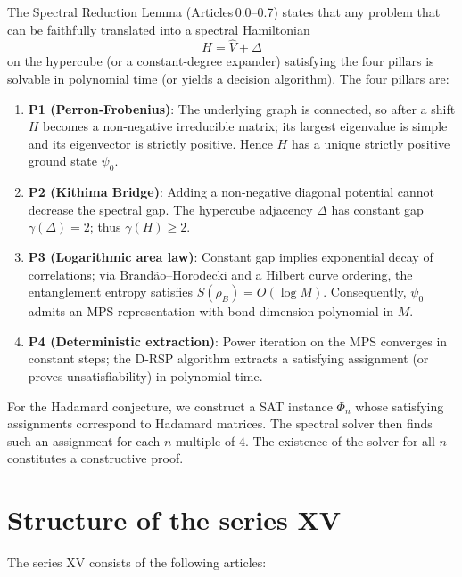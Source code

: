 \documentclass[11pt,a4paper]{article}
\begin{document}
The Spectral Reduction Lemma (Articles 0.0–0.7) states that any problem that can be faithfully translated into a spectral Hamiltonian
\[
H = \hat{V} + \Delta
\]
on the hypercube (or a constant‑degree expander) satisfying the four pillars is solvable in polynomial time (or yields a decision algorithm). The four pillars are:

\begin{enumerate}
\item \textbf{P1 (Perron‑Frobenius)}: The underlying graph is connected, so after a shift $H$ becomes a non‑negative irreducible matrix; its largest eigenvalue is simple and its eigenvector is strictly positive. Hence $H$ has a unique strictly positive ground state $\psi_0$.
\item \textbf{P2 (Kithima Bridge)}: Adding a non‑negative diagonal potential cannot decrease the spectral gap. The hypercube adjacency $\Delta$ has constant gap $\gamma(\Delta)=2$; thus $\gamma(H) \ge 2$.
\item \textbf{P3 (Logarithmic area law)}: Constant gap implies exponential decay of correlations; via Brandão–Horodecki and a Hilbert curve ordering, the entanglement entropy satisfies $S(\rho_B)=O(\log M)$. Consequently, $\psi_0$ admits an MPS representation with bond dimension polynomial in $M$.
\item \textbf{P4 (Deterministic extraction)}: Power iteration on the MPS converges in constant steps; the D‑RSP algorithm extracts a satisfying assignment (or proves unsatisfiability) in polynomial time.
\end{enumerate}

For the Hadamard conjecture, we construct a SAT instance $\Phi_n$ whose satisfying assignments correspond to Hadamard matrices. The spectral solver then finds such an assignment for each $n$ multiple of $4$. The existence of the solver for all $n$ constitutes a constructive proof.

\section{Structure of the series XV}

The series XV consists of the following articles:
\end{document}
